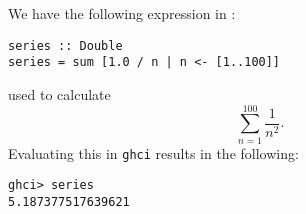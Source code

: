 
We have the following expression in : 
\begin{verbatim}
series :: Double
series = sum [1.0 / n | n <- [1..100]]
\end{verbatim}
used to calculate
\[
    \sum_{n=1}^{100} \frac{1}{n^2}.
\]
Evaluating this in \verb|ghci| results in the following:
\begin{verbatim}
ghci> series
5.187377517639621
\end{verbatim}
